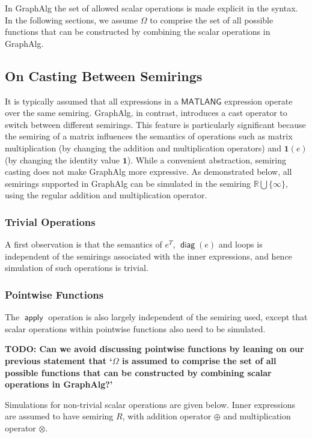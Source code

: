 \documentclass{article}
\newcommand\graphalg{\textsf{GraphAlg}}
\newcommand{\ML}{\mathsf{MATLANG}}
\newcommand{\transp}[1]{#1^T}
\newcommand{\rowdom}{\mathbf{1}}
\DeclareMathOperator{\diag}{\mathsf{diag}}
\DeclareMathOperator{\Apply}{\mathsf{apply}}
\newcommand{\one}{\rowdom}
\newcommand{\RR}{\mathbb{R}}
\begin{document}
In \graphalg{} the set of allowed scalar operations is made explicit in the syntax.
In the following sections, we assume $\Omega$ to comprise the set of all possible functions that can be constructed by combining the scalar operations in \graphalg{}.

\subsection{On Casting Between Semirings}
It is typically assumed that all expressions in a $\ML$ expression operate over the same semiring.
\graphalg{}, in contrast, introduces a cast operator to switch between different semirings.
This feature is particularly significant because the semiring of a matrix influences the semantics of operations such as matrix multiplication (by changing the addition and multiplication operators) and $\one(e)$ (by changing the identity value $\one$).
While a convenient abstraction, semiring casting does not make \graphalg{} more expressive.
As demonstrated below, all semirings supported in \graphalg{} can be simulated in the semiring $\RR \bigcup \{ \infty \}$, using the regular addition and multiplication operator.

\subsubsection*{Trivial Operations}
A first observation is that the semantics of $\transp{e}$, $\diag(e)$ and loops is independent of the semirings associated with the inner expressions, and hence simulation of such operations is trivial.

\subsubsection*{Pointwise Functions}
The $\Apply$ operation is also largely independent of the semiring used, except that scalar operations within pointwise functions also need to be simulated.

\textbf{TODO: Can we avoid discussing pointwise functions by leaning on our previous statement that `$\Omega$ is assumed to comprise the set of all possible functions that can be constructed by combining scalar operations in \graphalg{}?'}

Simulations for non-trivial scalar operations are given below.
Inner expressions are assumed to have semiring $R$, with addition operator $\oplus$ and multiplication operator $\otimes$.
\end{document}
